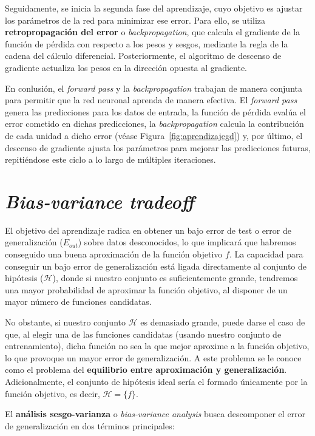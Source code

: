 Seguidamente, se inicia la segunda fase del aprendizaje, cuyo objetivo es ajustar los parámetros de la red para minimizar ese error. Para ello, se utiliza \textbf{retropropagación del error} o \emph{backpropagation}, que calcula el gradiente de la función de pérdida con respecto a los pesos y sesgos, mediante la regla de la cadena del cálculo diferencial. Posteriormente, el algoritmo de descenso de gradiente actualiza los pesos en la dirección opuesta al gradiente.

En conlusión, el \textit{forward pass} y la \textit{backpropagation} trabajan de manera conjunta para permitir que la red neuronal aprenda de manera efectiva. El \textit{forward pass} genera las predicciones para los datos de entrada, la función de pérdida evalúa el error cometido en dichas predicciones, la \textit{backpropagation} calcula la contribución de cada unidad a dicho error (véase Figura~\ref{fig:aprendizajegd}) y, por último, el descenso de gradiente ajusta los parámetros para mejorar las predicciones futuras, repitiéndose este ciclo a lo largo de múltiples iteraciones.

\section{\textit{Bias-variance tradeoff}}\label{sec:capitulo-bias-variance-tradeoff}
El objetivo del aprendizaje radica en obtener un bajo error de test o error de generalización ($E_{out}$) sobre datos desconocidos, lo que implicará que habremos conseguido una buena aproximación de la función objetivo $f$. La capacidad para conseguir un bajo error de generalización está ligada directamente al conjunto de hipótesis ($\mathcal{H}$), donde si nuestro conjunto es suficientemente grande, tendremos una mayor probabilidad de aproximar la función objetivo, al disponer de un mayor número de funciones candidatas.

No obstante, si nuestro conjunto $\mathcal{H}$ es demasiado grande, puede darse el caso de que, al elegir una de las funciones candidatas (usando nuestro conjunto de entrenamiento), dicha función no sea la que mejor aproxime a la función objetivo, lo que provoque un mayor error de generalización. A este problema se le conoce como el problema del \textbf{equilibrio entre aproximación y generalización}. Adicionalmente, el conjunto de hipótesis ideal sería el formado únicamente por la función objetivo, es decir, $\mathcal{H} = \{f\}$.

El \textbf{análisis sesgo-varianza} o \emph{bias-variance analysis} busca descomponer el error de generalización en dos términos principales:

